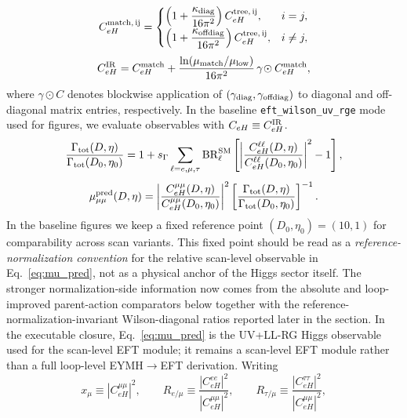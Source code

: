 \documentclass[aps,prd,onecolumn,notitlepage,nofootinbib,superscriptaddress,11pt,floatfix]{revtex4-2}
\begin{document}
\begin{equation}
C_{eH}^{\rm match,\,ij}=
\begin{cases}
\left(1+\dfrac{\kappa_{\rm diag}}{16\pi^2}\right) C_{eH}^{\rm tree,\,ij}, & i=j,\\[4pt]
\left(1+\dfrac{\kappa_{\rm offdiag}}{16\pi^2}\right) C_{eH}^{\rm tree,\,ij}, & i\neq j,
\end{cases}
\label{eq:ceh_finite_match}
\end{equation}
\begin{equation}
C_{eH}^{\rm IR}=C_{eH}^{\rm match}+\frac{\ln(\mu_{\rm match}/\mu_{\rm low})}{16\pi^2}\,\gamma\!\odot C_{eH}^{\rm match},
\label{eq:ceh_llrg}
\end{equation}
where $\gamma\!\odot C$ denotes blockwise application of $(\gamma_{\rm diag},\gamma_{\rm offdiag})$ to diagonal and off-diagonal matrix entries, respectively.
In the baseline \texttt{eft\_wilson\_uv\_rge} mode used for figures, we evaluate observables with $C_{eH}\equiv C_{eH}^{\rm IR}$.
\begin{equation}
\frac{\Gamma_{\rm tot}(D,\eta)}{\Gamma_{\rm tot}(D_0,\eta_0)}
=1+s_\Gamma\sum_{\ell=e,\mu,\tau}\mathrm{BR}_\ell^{\rm SM}
\left[
\left|\frac{C_{eH}^{\ell\ell}(D,\eta)}{C_{eH}^{\ell\ell}(D_0,\eta_0)}\right|^2-1
\right],
\label{eq:width_ratio_matched}
\end{equation}
\begin{equation}
\mu_{\mu\mu}^{\rm pred}(D,\eta)=
\left|\frac{C_{eH}^{\mu\mu}(D,\eta)}{C_{eH}^{\mu\mu}(D_0,\eta_0)}\right|^2
\left[\frac{\Gamma_{\rm tot}(D,\eta)}{\Gamma_{\rm tot}(D_0,\eta_0)}\right]^{-1}.
\label{eq:mu_pred}
\end{equation}
In the baseline figures we keep a fixed reference point $(D_0,\eta_0)=(10,1)$ for comparability across scan variants.
This fixed point should be read as a \emph{reference-normalization convention} for the relative scan-level observable in Eq.~\eqref{eq:mu_pred}, not as a physical anchor of the Higgs sector itself. The stronger normalization-side information now comes from the absolute and loop-improved parent-action comparators below together with the reference-normalization-invariant Wilson-diagonal ratios reported later in the section.
In the executable closure, Eq.~\eqref{eq:mu_pred} is the UV+LL-RG Higgs observable used for the scan-level EFT module; it remains a scan-level EFT module rather than a full loop-level EYMH$\rightarrow$EFT derivation.
Writing
\[
x_\mu\equiv |C_{eH}^{\mu\mu}|^2,\qquad
R_{e/\mu}\equiv \frac{|C_{eH}^{ee}|^2}{|C_{eH}^{\mu\mu}|^2},\qquad
R_{\tau/\mu}\equiv \frac{|C_{eH}^{\tau\tau}|^2}{|C_{eH}^{\mu\mu}|^2},
\]
\end{document}
